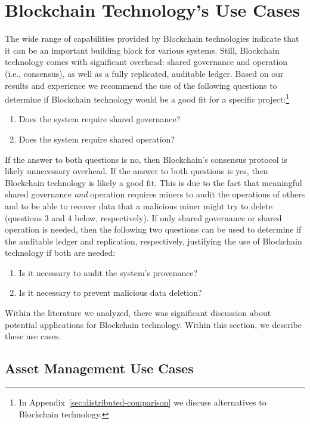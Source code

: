 
\section{Blockchain Technology's Use Cases}
\label{sec:use-cases}

The wide range of capabilities provided by Blockchain technologies indicate that it can be an important building block for various systems.
Still, Blockchain technology comes with significant overhead: shared governance and operation (i.e., consensus), as well as  a fully replicated, auditable ledger.
Based on our results and experience we recommend the use of the following questions to determine if Blockchain technology would be a good fit for a specific project:\footnote{In Appendix~\ref{sec:distributed-comparison} we discuss alternatives to Blockchain technology.}

\begin{enumerate}
	\item Does the system require shared governance?
	\item Does the system require shared operation?
\end{enumerate}

If the answer to both questions is no, then Blockchain's consensus protocol is likely unnecessary overhead. If the answer to both questions is yes, then Blockchain technology is likely a good fit. This is due to the fact that meaningful shared governance \emph{and} operation requires miners to audit the operations of others and to be able to recover data that a malicious miner might try to delete (questions 3 and 4 below, respectively). If only shared governance or shared operation is needed, then the following two questions can be used to determine if the auditable ledger and replication, respectively, justifying the use of Blockchain technology if both are needed:

\begin{enumerate}[start=3]
	\item Is it necessary to audit the system's provenance?
	\item Is it necessary to prevent malicious data deletion?
\end{enumerate}

Within the literature we analyzed, there was significant discussion about potential applications for Blockchain technology.
Within this section, we describe these use cases.

\subsection{Asset Management Use Cases}

